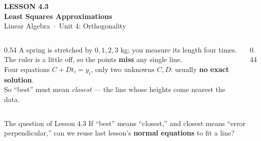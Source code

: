 \documentclass[aspectratio=169, 11pt]{beamer}
\begin{document}
{
\begin{frame}[plain]
  \vspace{2.8cm}\hspace{0.55cm}%
  \begin{minipage}{0.9\textwidth}
    {\color{goldacc}\bfseries\small LESSON 4.3}\\[0.5cm]
    {\color{white}\bfseries\LARGE Least Squares Approximations}\\[1.0cm]
    {\color{blushmid}\small Linear Algebra~$\cdot$~Unit 4: Orthogonality}
  \end{minipage}
\end{frame}
}

\begin{frame}[t, plain]
  \begin{columns}[T]
    \begin{column}{0.54\textwidth}
      A spring is stretched by $0,1,2,3$ kg; you measure its length four times. The ruler is a little off,
      so the points \textbf{miss} any single line.\\[6pt]
      Four equations $C+Dt_i=y_i$, only two unknowns $C,D$: usually \textbf{no exact solution}.\\[8pt]
      So ``best'' must mean \emph{closest} --- the line whose heights come nearest the data.
    \end{column}
    \begin{column}{0.44\textwidth}
      \centering
    \end{column}
  \end{columns}
  \vspace{4pt}
  \begin{block}{The question of Lesson 4.3}
    If ``best'' means ``closest,'' and closest means ``error perpendicular,'' can we reuse last lesson's
    \textbf{normal equations} to fit a line?
  \end{block}
\end{frame}
\end{document}
